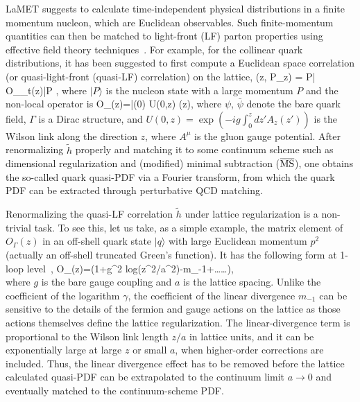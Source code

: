 LaMET suggests to calculate time-independent physical distributions in a finite momentum nucleon, which
are Euclidean observables. Such finite-momentum quantities can then be matched to light-front (LF)
parton properties using effective field theory techniques~\cite{Ji:2020byp}. For example, for the collinear quark distributions, it has been suggested to first compute a Euclidean space correlation (or quasi-light-front (quasi-LF) correlation) on the lattice, 
\bea\label{eq:quasi}
(z, P_z) = \langle P| O_{\gamma_t}(z)|P \rangle,
\eea
where $|P\rangle$ is the nucleon state with a large momentum $P$ and the non-local operator is
\bea\label{eq:operator}
O_{\Gamma}(z)=\bar{\psi}(0) \Gamma U(0,z) \psi (z),
\eea
where $\psi$, $\bar{\psi}$ denote the bare quark field, $\Gamma$ is a Dirac structure,  and $U(0, z) = \exp(-ig\int_0^{z} dz' A_z(z'))$ is the Wilson link along the direction $z$, where $A^\mu$ is the gluon gauge potential. After renormalizing $\tilde{h}$ properly and matching it to some continuum scheme such as
dimensional regularization and (modified) minimal subtraction ($\overline{\rm MS}$), one obtains the so-called quark quasi-PDF via a Fourier transform, from which the quark PDF can be extracted through perturbative QCD matching. 

Renormalizing the quasi-LF correlation $\tilde{h}$ under lattice regularization is a non-trivial task. To see this, let us take, as a simple example, the matrix element of $O_\Gamma(z)$ in an off-shell quark state $|q\rangle$ with large Euclidean momentum $p^2$ (actually an off-shell truncated Green's function). It has the following form at 1-loop level~\cite{Alexandrou:2017huk},
\bea\label{eq:1-loop}
\langle O_{\Gamma}(z)\rangle =\Gamma\left(1+\gamma g^2 \textrm{log}(z^2/a^2)-m_{-1}+……\right),\nonumber\\
\eea
where $g$ is the bare gauge coupling and $a$ is the lattice spacing. Unlike the coefficient of the logarithm $\gamma$, the coefficient of the linear divergence $m_{-1}$ can be sensitive to the details of the fermion and gauge actions on the lattice as those actions themselves define the lattice regularization. The linear-divergence term is proportional to the Wilson link length $z/a$ in lattice units, and it can be exponentially large at large $z$ or small $a$, when higher-order corrections are included. Thus, the linear divergence effect has to be removed before the lattice calculated quasi-PDF can be extrapolated to the continuum limit $a\rightarrow0$ and eventually matched to the continuum-scheme PDF.

